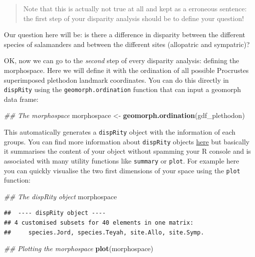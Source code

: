 \documentclass[
]{book}
\newenvironment{Shaded}{\begin{snugshade}}{\end{snugshade}}
\newcommand{\CommentTok}[1]{\textcolor[rgb]{0.56,0.35,0.01}{\textit{#1}}}
\newcommand{\KeywordTok}[1]{\textcolor[rgb]{0.13,0.29,0.53}{\textbf{#1}}}
\newcommand{\NormalTok}[1]{#1}
\newcommand{\StringTok}[1]{\textcolor[rgb]{0.31,0.60,0.02}{#1}}
\begin{document}
\begin{quote}
Note that this is actually not true at all and kept as a erroneous sentence: the first step of your disparity analysis should be to define your question!
\end{quote}

Our question here will be: is there a difference in disparity between the different species of salamanders and between the different sites (allopatric and sympatric)?

OK, now we can go to the \emph{second} step of every disparity analysis: defining the morphospace.
Here we will define it with the ordination of all possible Procrustes superimposed plethodon landmark coordinates.
You can do this directly in \texttt{dispRity} using the \texttt{geomorph.ordination} function that can input a geomorph data frame:

\begin{Shaded}
\begin{Highlighting}[]
\CommentTok{\#\# The morphospace}
\NormalTok{morphospace \textless{}{-}}\StringTok{ }\KeywordTok{geomorph.ordination}\NormalTok{(gdf\_plethodon)}
\end{Highlighting}
\end{Shaded}

This automatically generates a \texttt{dispRity} object with the information of each groups. You can find more information about \texttt{dispRity} objects \protect\hyperlink{disprity-object}{here} but basically it summarises the content of your object without spamming your R console and is associated with many utility functions like \texttt{summary} or \texttt{plot}. For example here you can quickly visualise the two first dimensions of your space using the \texttt{plot} function:

\begin{Shaded}
\begin{Highlighting}[]
\CommentTok{\#\# The dispRity object}
\NormalTok{morphospace}
\end{Highlighting}
\end{Shaded}

\begin{verbatim}
##  ---- dispRity object ---- 
## 4 customised subsets for 40 elements in one matrix:
##     species.Jord, species.Teyah, site.Allo, site.Symp.
\end{verbatim}

\begin{Shaded}
\begin{Highlighting}[]
\CommentTok{\#\# Plotting the morphospace}
\KeywordTok{plot}\NormalTok{(morphospace)}
\end{Highlighting}
\end{Shaded}
\end{document}
